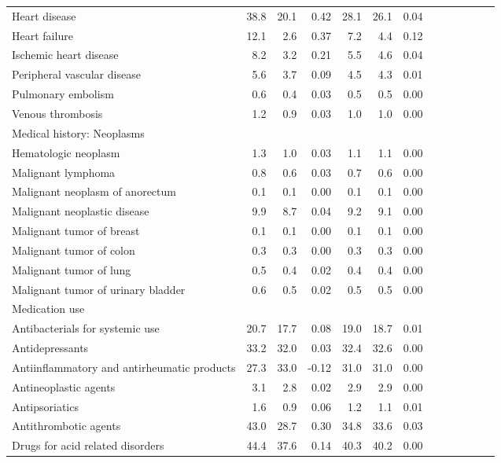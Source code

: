 \documentclass[11pt,]{article}
\begin{document}
\begin{longtable}{lrrrrrrrrrrrr}
      Heart disease & 38.8 & 20.1 &  0.42 & 28.1 & 26.1 &  0.04 \\ 
      Heart failure & 12.1 &  2.6 &  0.37 &  7.2 &  4.4 &  0.12 \\ 
      Ischemic heart disease &  8.2 &  3.2 &  0.21 &  5.5 &  4.6 &  0.04 \\ 
      Peripheral vascular disease &  5.6 &  3.7 &  0.09 &  4.5 &  4.3 &  0.01 \\ 
      Pulmonary embolism &  0.6 &  0.4 &  0.03 &  0.5 &  0.5 &  0.00 \\ 
      Venous thrombosis &  1.2 &  0.9 &  0.03 &  1.0 &  1.0 &  0.00 \\ 
  Medical history: Neoplasms &    &    &     &    &    &     \\ 
      Hematologic neoplasm &  1.3 &  1.0 &  0.03 &  1.1 &  1.1 &  0.00 \\ 
      Malignant lymphoma &  0.8 &  0.6 &  0.03 &  0.7 &  0.6 &  0.00 \\ 
      Malignant neoplasm of anorectum &  0.1 &  0.1 &  0.00 &  0.1 &  0.1 &  0.00 \\ 
      Malignant neoplastic disease &  9.9 &  8.7 &  0.04 &  9.2 &  9.1 &  0.00 \\ 
      Malignant tumor of breast &  0.1 &  0.1 &  0.00 &  0.1 &  0.1 &  0.00 \\ 
      Malignant tumor of colon &  0.3 &  0.3 &  0.00 &  0.3 &  0.3 &  0.00 \\ 
      Malignant tumor of lung &  0.5 &  0.4 &  0.02 &  0.4 &  0.4 &  0.00 \\ 
      Malignant tumor of urinary bladder &  0.6 &  0.5 &  0.02 &  0.5 &  0.5 &  0.00 \\ 
  Medication use &    &    &     &    &    &     \\ 
      Antibacterials for systemic use & 20.7 & 17.7 &  0.08 & 19.0 & 18.7 &  0.01 \\ 
      Antidepressants & 33.2 & 32.0 &  0.03 & 32.4 & 32.6 &  0.00 \\ 
      Antiinflammatory and antirheumatic products & 27.3 & 33.0 & -0.12 & 31.0 & 31.0 &  0.00 \\ 
      Antineoplastic agents &  3.1 &  2.8 &  0.02 &  2.9 &  2.9 &  0.00 \\ 
      Antipsoriatics &  1.6 &  0.9 &  0.06 &  1.2 &  1.1 &  0.01 \\ 
      Antithrombotic agents & 43.0 & 28.7 &  0.30 & 34.8 & 33.6 &  0.03 \\ 
      Drugs for acid related disorders & 44.4 & 37.6 &  0.14 & 40.3 & 40.2 &  0.00 \\ 

\end{longtable}
\end{document}

